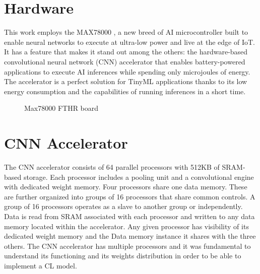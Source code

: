 \section{Hardware}
\label{cha:hwardware}
\quad This work employs the MAX78000 \cite{Max78000}, a new breed of AI microcontroller built to enable neural networks to execute at ultra-low power and live at the edge of IoT. It has a feature that makes it stand out among the others: the hardware-based convolutional neural network (CNN) accelerator that enables battery-powered applications to execute AI inferences while spending only microjoules of energy. The accelerator is a perfect solution for TinyML applications thanks to its low energy consumption and the capabilities of running inferences in a short time. 

\begin{figure}[!ht]
\centerline{}
\caption{Max78000 FTHR board}
\label{max78000_board}
\end{figure}

\section{CNN Accelerator}
\label{sec:456}
\quad The CNN accelerator consists of 64 parallel processors with 512KB of SRAM-based storage. Each processor includes a pooling unit and a convolutional engine with dedicated weight memory. Four processors share one data memory. These are further organized into groups of 16 processors that share common controls. A group of 16 processors operates as a slave to another group or independently. Data is read from SRAM associated with each processor and written to any data memory located within the accelerator. Any given processor has visibility of its dedicated weight memory and the Data memory instance it shares with the three others.
The CNN accelerator has multiple processors and it was fundamental to understand its functioning and its weights distribution in order to be able to implement a CL model.


